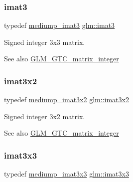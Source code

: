 \subsubsection{\texorpdfstring{imat3}{imat3}}
{\footnotesize\ttfamily typedef \mbox{\hyperlink{group__gtc__matrix__integer_gac6ab7a5cfe157ba8deb79a7691ad8263}{mediump\+\_\+imat3}} \mbox{\hyperlink{group__gtc__matrix__integer_ga45481922dd07a3a8e23758286311ee97}{glm\+::imat3}}}

Signed integer 3x3 matrix. \begin{DoxySeeAlso}{See also}
\mbox{\hyperlink{group__gtc__matrix__integer}{G\+L\+M\+\_\+\+G\+T\+C\+\_\+matrix\+\_\+integer}} 
\end{DoxySeeAlso}
\mbox{\label{group__gtc__matrix__integer_ga04deef94cdfdd3b3b2706e10a32ef7f3}} 
\subsubsection{\texorpdfstring{imat3x2}{imat3x2}}
{\footnotesize\ttfamily typedef \mbox{\hyperlink{group__gtc__matrix__integer_gae3f0a14fb81eb2edc0caf5b131adb969}{mediump\+\_\+imat3x2}} \mbox{\hyperlink{group__gtc__matrix__integer_ga04deef94cdfdd3b3b2706e10a32ef7f3}{glm\+::imat3x2}}}

Signed integer 3x2 matrix. \begin{DoxySeeAlso}{See also}
\mbox{\hyperlink{group__gtc__matrix__integer}{G\+L\+M\+\_\+\+G\+T\+C\+\_\+matrix\+\_\+integer}} 
\end{DoxySeeAlso}
\mbox{\label{group__gtc__matrix__integer_gaeff9ef8f56cccc828d6b897923e75402}} 
\subsubsection{\texorpdfstring{imat3x3}{imat3x3}}
{\footnotesize\ttfamily typedef \mbox{\hyperlink{group__gtc__matrix__integer_ga1304a2da9c3f5937aa8c4684d638d09c}{mediump\+\_\+imat3x3}} \mbox{\hyperlink{group__gtc__matrix__integer_gaeff9ef8f56cccc828d6b897923e75402}{glm\+::imat3x3}}}

